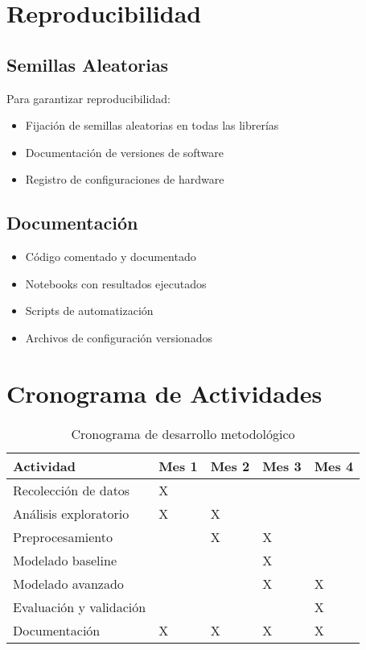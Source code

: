 \section{Reproducibilidad}

\subsection{Semillas Aleatorias}

Para garantizar reproducibilidad:
\begin{itemize}
    \item Fijación de semillas aleatorias en todas las librerías
    \item Documentación de versiones de software
    \item Registro de configuraciones de hardware
\end{itemize}

\subsection{Documentación}

\begin{itemize}
    \item Código comentado y documentado
    \item Notebooks con resultados ejecutados
    \item Scripts de automatización
    \item Archivos de configuración versionados
\end{itemize}

\section{Cronograma de Actividades}

\begin{table}[htbp]
\centering
\caption{Cronograma de desarrollo metodológico}
\begin{tabular}{@{}p{4cm}p{2cm}p{2cm}p{2cm}p{2cm}@{}}
\toprule
\textbf{Actividad} & \textbf{Mes 1} & \textbf{Mes 2} & \textbf{Mes 3} & \textbf{Mes 4} \\
\midrule
Recolección de datos & X & & & \\
Análisis exploratorio & X & X & & \\
Preprocesamiento & & X & X & \\
Modelado baseline & & & X & \\
Modelado avanzado & & & X & X \\
Evaluación y validación & & & & X \\
Documentación & X & X & X & X \\
\bottomrule
\end{tabular}
\label{tab:cronograma}
\end{table}

